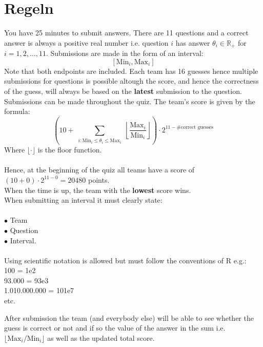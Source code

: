 \documentclass[12pt,a4paper]{article}
\begin{document}
 
\section*{Regeln}
You have 25 minutes to submit answers. There are 11 questions and a correct answer is always a positive real number i.e. question $i$ has answer $\theta_i \in \mathbb{R}_+$ for $i = 1,2,\ldots,11$. Submissions are made in the form of an interval:
$$
[\text{Min}_i, \text{Max}_i]
$$
Note that both endpoints are included. Each team has 16 guesses hence multiple submissions for questions is possible altough the score, and hence the correctness of the guess, will always be based on the \textbf{latest} submission to the question.
Submissions can be made throughout the quiz. 
The team's score is given by the formula:
$$
\left( 10 + \sum_{\substack{i : \text{Min}_i \leq \theta_i \leq \text{Max}_i}} \left\lfloor \frac{\text{Max}_i}{\text{Min}_i} \right\rfloor \right) \cdot 2^{11 - \# \text{correct guesses} }
$$
Where $\lfloor \cdot \rfloor$ is the floor function.\\ \\
Hence, at the beginning of the quiz all teams have a score of
$(10 + 0)\cdot 2^{11-0} = 20480$ points. \\
When the time is up, the team with the \textbf{lowest} score wins.\\
When submitting an interval it must clearly state:\\ \\
$\bullet$ Team\\
$\bullet$ Question\\
$\bullet$ Interval. \\ \\
Using scientific notation is allowed but must follow the conventions of R e.g.:\\
100 = 1e2 \\
93.000 = 93e3 \\
1.010.000.000 = 101e7 \\
etc.

After submission the team (and everybody else) will be able to see whether the guess is correct or not and if so the value of the answer in the sum i.e. $\lfloor \text{Max}_i / \text{Min}_i \rfloor$ as well as the updated total score.

\newpage
\end{document}
